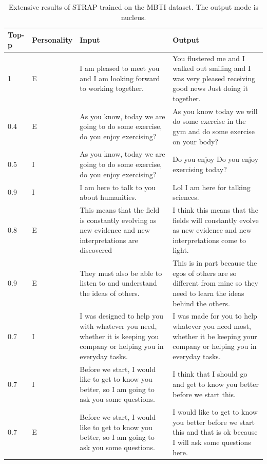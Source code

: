 \documentclass[nomenclature, english, biblatex]{kththesis}
\begin{document}
\begin{table}
    \centering
    \begin{adjustbox}{max width=\textwidth}
        \begin{tabular}{|p{}|p{}|p{}|p{}|}
        \hline
        Top-p & Personality & Input & Output \\
        \hline
        \hline
        1 & E & I am pleased to meet you and I am looking forward to working together. & You flustered me and I walked out smiling and I was very pleased receiving good news Just doing it together.\\
        \hline
        0.4 & E & As you know, today we are going to do some exercise, do you enjoy exercising? & As you know today we will do some exercise in the gym and do some exercise on your body? \\
        \hline
        0.5 & I & As you know, today we are going to do some exercise, do you enjoy exercising? & Do you enjoy Do you enjoy exercising today? \\
        \hline
        0.9 & I & I am here to talk to you about humanities. & Lol I am here for talking sciences.\\
        \hline
        0.8 & E & This means that the field is constantly evolving as new evidence and new interpretations are discovered & I think this means that the fields will constantly evolve as new evidence and new interpretations come to light.\\
        \hline
        0.9 & E & They must also be able to listen to and understand the ideas of others. & This is in part because the egos of others are so different from mine so they need to learn the ideas behind the others.\\
        \hline
        0.7 & I & I was designed to help you with whatever you need, whether it is keeping you company or helping you in everyday tasks. & I was made for you to help whatever you need most, whether it be keeping your company or helping you in everyday tasks.\\
        \hline
        0.7 & I & Before we start, I would like to get to know you better, so I am going to ask you some questions. & I think that I should go and get to know you better before we start this. \\
        \hline
        0.7 & E & Before we start, I would like to get to know you better, so I am going to ask you some questions. & I would like to get to know you better before we start this and that is ok because I will ask some questions here.\\
        \hline
        \end{tabular}
    \end{adjustbox}
    \caption{Extensive results of STRAP trained on the MBTI dataset. The output mode is nucleus.}
    \label{tab:strap_n_mbti_extensive}
\end{table}
\end{document}
